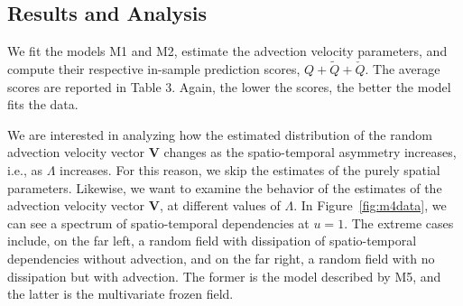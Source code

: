 \documentclass[12pt]{article}
\newcommand{\0}{\mathbf{0}}
\begin{document}
\subsection{Results and Analysis}

We fit the models M1 and M2, estimate the advection velocity parameters, and compute their respective in-sample prediction scores, $Q + \tilde{Q} + \check{Q} $. The average scores are reported in Table 3. Again, the lower the scores, the better the model fits the data. 

We are interested in analyzing how the estimated distribution of the random advection velocity vector $\mathbf{V}$ changes as the spatio-temporal asymmetry increases, i.e., as $\Lambda$ increases. For this reason, we skip the estimates of the purely spatial parameters. Likewise, we want to examine the behavior of the estimates of the advection velocity vector $\mathbf{V}$, at different values of $\Lambda$. In Figure~\ref{fig:m4data}, we can see a spectrum of spatio-temporal dependencies at $u=1$. The extreme cases include, on the far left, a random field with dissipation of spatio-temporal dependencies without advection, and on the far right, a random field with no dissipation but with advection. The former is the model described by M5, and the latter is the multivariate frozen field. 

\begin{table}[b!]
\centering
{}
\end{table}
\end{document}
